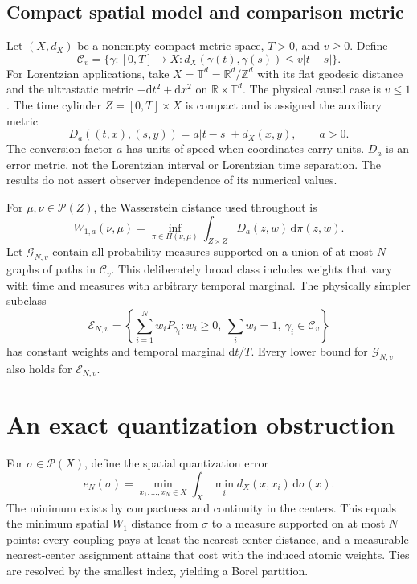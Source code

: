 \documentclass[aip,jmp,reprint,onecolumn,amsmath,amssymb]{revtex4-2}
\newcommand{\dd}{\mathrm{d}}
\newcommand{\R}{\mathbb R}
\newcommand{\T}{\mathbb T}
\newcommand{\Pp}{\mathcal P}
\newcommand{\C}{\mathcal C}
\newcommand{\G}{\mathcal G}
\theoremstyle{definition}
\begin{document}
\subsection{Compact spatial model and comparison metric}
Let $(X,d_X)$ be a nonempty compact metric space, $T>0$, and $v\ge0$. Define
\begin{equation}
 \C_v=\{\gamma:[0,T]\to X: d_X(\gamma(t),\gamma(s))\le v|t-s|\}.
\end{equation}
For Lorentzian applications, take $X=\T^d=\R^d/\mathbb Z^d$ with its flat geodesic distance and the ultrastatic metric $-\dd t^2+\dd x^2$ on $\R\times\T^d$. The physical causal case is $v\le1$. The time cylinder $Z=[0,T]\times X$ is compact and is assigned the auxiliary metric
\begin{equation}
 D_a((t,x),(s,y))=a|t-s|+d_X(x,y),\qquad a>0.
 \label{eq:metric}
\end{equation}
The conversion factor $a$ has units of speed when coordinates carry units. $D_a$ is an error metric, not the Lorentzian interval or Lorentzian time separation. The results do not assert observer independence of its numerical values.

For $\mu,\nu\in\Pp(Z)$, the Wasserstein distance used throughout is
\begin{equation}
 W_{1,a}(\nu,\mu)=\inf_{\pi\in\Pi(\nu,\mu)}\int_{Z\times Z}D_a(z,w)\,\dd\pi(z,w).
 \label{eq:W}
\end{equation}
Let $\G_{N,v}$ contain all probability measures supported on a union of at most $N$ graphs of paths in $\C_v$. This deliberately broad class includes weights that vary with time and measures with arbitrary temporal marginal. The physically simpler subclass
\begin{equation}
 \mathcal E_{N,v}=\left\{\sum_{i=1}^N w_iP_{\gamma_i}:w_i\ge0,\ \sum_iw_i=1,\ \gamma_i\in\C_v\right\}
 \label{eq:E}
\end{equation}
has constant weights and temporal marginal $\dd t/T$. Every lower bound for $\G_{N,v}$ also holds for $\mathcal E_{N,v}$.

\section{An exact quantization obstruction}
For $\sigma\in\Pp(X)$, define the spatial quantization error
\begin{equation}
 e_N(\sigma)=\min_{x_1,\ldots,x_N\in X}\int_X\min_i d_X(x,x_i)\,\dd\sigma(x).
 \label{eq:quantization}
\end{equation}
The minimum exists by compactness and continuity in the centers. This equals the minimum spatial $W_1$ distance from $\sigma$ to a measure supported on at most $N$ points: every coupling pays at least the nearest-center distance, and a measurable nearest-center assignment attains that cost with the induced atomic weights. Ties are resolved by the smallest index, yielding a Borel partition.
\end{document}
